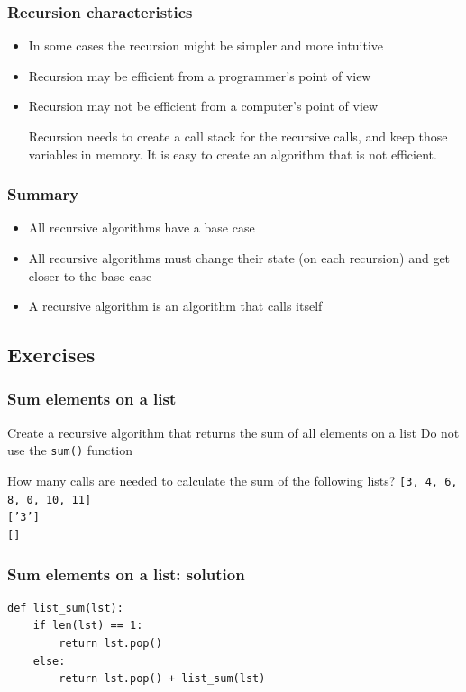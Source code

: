 \documentclass[11pt]{beamer}
\begin{document}
\begin{frame}\frametitle{Recursion characteristics}
\begin{itemize}
\item In some cases the recursion might be simpler and more intuitive
\item Recursion may be efficient from a programmer's point of view
\item Recursion may not be efficient from a computer's point of view
\begin{block}{}
Recursion needs to create a call stack for the recursive calls, and keep those variables in memory. It is easy to create an algorithm that is not efficient.
\end{block}
\end{itemize}
\end{frame}

\begin{frame}\frametitle{Summary}
\begin{itemize}
\item All recursive algorithms have a base case
\item All recursive algorithms must change their state (on each recursion) and get closer to the base case
\item A recursive algorithm is an algorithm that calls itself
\end{itemize}
\end{frame}

\subsection{Exercises}

\begin{frame}\frametitle{Sum elements on a list}
\begin{block}{Create a recursive algorithm that returns the sum of all elements on a list}
Do not use the \texttt{sum()} function
\end{block}
\begin{block}{How many calls are needed to calculate the sum of the following lists?}
\texttt{[3, 4, 6, 8, 0, 10, 11]} \\
\texttt{['3']} \\
\texttt{[]}
\end{block}
\end{frame}


\begin{frame}[fragile]\frametitle{Sum elements on a list: solution}
\begin{lstlisting}
def list_sum(lst):
    if len(lst) == 1:
        return lst.pop()
    else:
        return lst.pop() + list_sum(lst)
\end{lstlisting}
\end{frame}
\end{document}
